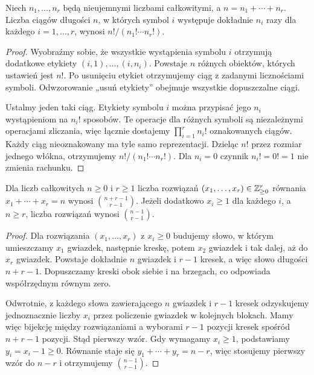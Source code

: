 \begin{twierdzenie}
Niech $n_1,\ldots,n_r$ będą nieujemnymi liczbami całkowitymi, a
$n=n_1+\cdots+n_r$. Liczba ciągów długości $n$, w których symbol $i$
występuje dokładnie $n_i$ razy dla każdego $i=1,\ldots,r$, wynosi
$n!/(n_1!\cdots n_r!)$.
\end{twierdzenie}
\begin{proof}
Wyobraźmy sobie, że wszystkie wystąpienia symbolu $i$
otrzymują dodatkowe etykiety $(i,1),\ldots,(i,n_i)$.
Powstaje $n$ różnych obiektów, których ustawień jest $n!$.
Po usunięciu etykiet otrzymujemy ciąg z zadanymi
licznościami symboli. Odwzorowanie „usuń etykiety”
obejmuje wszystkie dopuszczalne ciągi.

Ustalmy jeden taki ciąg. Etykiety symbolu $i$
można przypisać jego $n_i$ wystąpieniom na $n_i!$
sposobów. Te operacje dla różnych symboli są niezależnymi
operacjami zliczania, więc łącznie dostajemy
$\prod_{i=1}^r n_i!$ oznakowanych ciągów.
Każdy ciąg nieoznakowany ma tyle samo reprezentacji.
Dzieląc $n!$ przez rozmiar jednego włókna, otrzymujemy
$n!/(n_1!\cdots n_r!)$.
Dla $n_i=0$ czynnik $n_i!=0!=1$ nie zmienia rachunku.
\end{proof}

\begin{twierdzenie}
Dla liczb całkowitych $n\geq0$ i $r\geq1$ liczba rozwiązań
$(x_1,\ldots,x_r)\in\mathbb{Z}_{\geq0}^r$ równania $x_1+\cdots+x_r=n$ wynosi
$\binom{n+r-1}{r-1}$. Jeżeli dodatkowo $x_i\geq1$ dla każdego $i$,
a $n\geq r$, liczba rozwiązań wynosi $\binom{n-1}{r-1}$.
\end{twierdzenie}
\begin{proof}
Dla rozwiązania $(x_1,\ldots,x_r)$ z $x_i\geq0$
budujemy słowo, w którym umieszczamy $x_1$ gwiazdek,
następnie kreskę, potem $x_2$ gwiazdek i tak dalej,
aż do $x_r$ gwiazdek. Powstaje dokładnie $n$ gwiazdek
i $r-1$ kresek, a więc słowo długości $n+r-1$.
Dopuszczamy kreski obok siebie i na brzegach,
co odpowiada współrzędnym równym zero.

Odwrotnie, z każdego słowa zawierającego $n$ gwiazdek
i $r-1$ kresek odzyskujemy jednoznacznie liczby $x_i$
przez policzenie gwiazdek w kolejnych blokach.
Mamy więc bijekcję między rozwiązaniami a wyborami
$r-1$ pozycji kresek spośród $n+r-1$ pozycji.
Stąd pierwszy wzór. Gdy wymagamy $x_i\geq1$, podstawiamy
$y_i=x_i-1\geq0$. Równanie staje się
$y_1+\cdots+y_r=n-r$, więc stosujemy pierwszy wzór
do $n-r$ i otrzymujemy $\binom{n-1}{r-1}$.
\end{proof}

